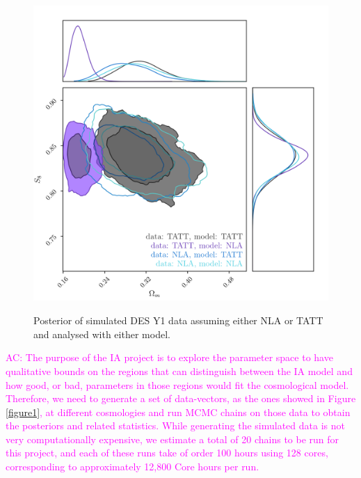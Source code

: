 \documentclass[12pt]{article}
\newcommand{\acampos}[1]{\textcolor{magenta}{AC: #1}}
\begin{document}
\begin{small}

\begin{figure}[!h]
\begin{center}
\includegraphics[height=12cm]{1x2pt_TATT_NLA_mn_all.png}
\end{center}
 \caption{Posterior of simulated DES Y1 data assuming either NLA or TATT and analysed with either model.}
\label{figure2}
\end{figure}

\acampos{The purpose of the IA project is to explore the parameter space to have qualitative bounds on the regions that can distinguish between the IA model and how good, or bad, parameters in those regions would fit the cosmological model. Therefore, we need to generate a set of data-vectors, as the ones showed in Figure \ref{figure1}, at different cosmologies and run MCMC chains on those data to obtain the posteriors and related statistics. While generating the simulated data is not very computationally expensive, we estimate a total of 20 chains to be run for this project, and each of these runs take of order 100 hours using 128 cores, corresponding to approximately 12,800 Core hours per run.}



\end{small}
\end{document}
